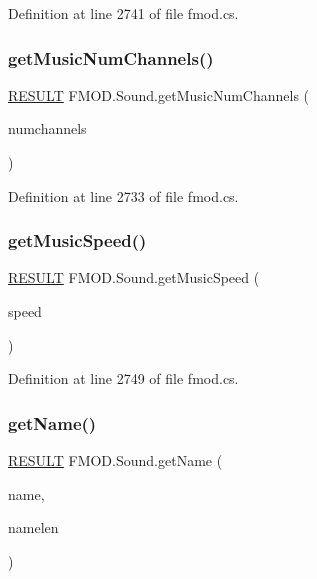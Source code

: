 Definition at line 2741 of file fmod.\+cs.

\mbox{\label{class_f_m_o_d_1_1_sound_a04c89002c6cdd81c5a72f8f568b5ad91}} 
\subsubsection{\texorpdfstring{get\+Music\+Num\+Channels()}{getMusicNumChannels()}}
{\footnotesize\ttfamily \hyperlink{namespace_f_m_o_d_a305d1176ef3f8c8815861a60407ac33d}{R\+E\+S\+U\+LT} F\+M\+O\+D.\+Sound.\+get\+Music\+Num\+Channels (\begin{DoxyParamCaption}\item[{out int}]{numchannels }\end{DoxyParamCaption})}



Definition at line 2733 of file fmod.\+cs.

\mbox{\label{class_f_m_o_d_1_1_sound_aa08d130a2df520770aabd0f08871d411}} 
\subsubsection{\texorpdfstring{get\+Music\+Speed()}{getMusicSpeed()}}
{\footnotesize\ttfamily \hyperlink{namespace_f_m_o_d_a305d1176ef3f8c8815861a60407ac33d}{R\+E\+S\+U\+LT} F\+M\+O\+D.\+Sound.\+get\+Music\+Speed (\begin{DoxyParamCaption}\item[{out float}]{speed }\end{DoxyParamCaption})}



Definition at line 2749 of file fmod.\+cs.

\mbox{\label{class_f_m_o_d_1_1_sound_a70c55e1a1267bc319381f2581591aba6}} 
\subsubsection{\texorpdfstring{get\+Name()}{getName()}}
{\footnotesize\ttfamily \hyperlink{namespace_f_m_o_d_a305d1176ef3f8c8815861a60407ac33d}{R\+E\+S\+U\+LT} F\+M\+O\+D.\+Sound.\+get\+Name (\begin{DoxyParamCaption}\item[{String\+Builder}]{name,  }\item[{int}]{namelen }\end{DoxyParamCaption})}



